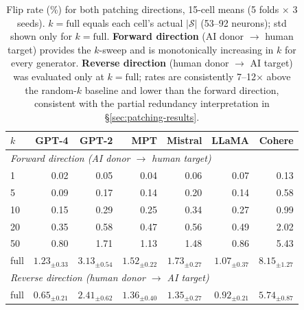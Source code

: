 \documentclass[11pt]{article}
\begin{document}
\begin{table}[!htbp]
\centering
\small
\begin{tabular}{lrrrrrr}
\toprule
$k$ & GPT-4 & GPT-2 & MPT & Mistral & LLaMA & Cohere \\
\midrule
\multicolumn{7}{l}{\textit{Forward direction (AI donor $\to$ human target)}} \\
1    & 0.02 & 0.05 & 0.04 & 0.06 & 0.07 & 0.13 \\
5    & 0.09 & 0.17 & 0.14 & 0.20 & 0.14 & 0.58 \\
10   & 0.15 & 0.29 & 0.25 & 0.34 & 0.27 & 0.99 \\
20   & 0.35 & 0.58 & 0.47 & 0.56 & 0.49 & 2.02 \\
50   & 0.80 & 1.71 & 1.13 & 1.48 & 0.86 & 5.43 \\
full & $1.23_{\pm 0.33}$ & $3.13_{\pm 0.54}$ & $1.52_{\pm 0.22}$ & $1.73_{\pm 0.27}$ & $1.07_{\pm 0.37}$ & $8.15_{\pm 1.27}$ \\
\midrule
\multicolumn{7}{l}{\textit{Reverse direction (human donor $\to$ AI target)}} \\
full & $0.65_{\pm 0.21}$ & $2.41_{\pm 0.62}$ & $1.36_{\pm 0.40}$ & $1.35_{\pm 0.27}$ & $0.92_{\pm 0.21}$ & $5.74_{\pm 0.87}$ \\
\bottomrule
\end{tabular}
\caption{Flip rate (\%) for both patching directions, 15-cell means (5 folds $\times$ 3 seeds). $k = \text{full}$ equals each cell's actual $|\mathcal{S}|$ (53--92 neurons); std shown only for $k = \text{full}$. \textbf{Forward direction} (AI donor $\to$ human target) provides the $k$-sweep and is monotonically increasing in $k$ for every generator. \textbf{Reverse direction} (human donor $\to$ AI target) was evaluated only at $k = \text{full}$; rates are consistently 7--12$\times$ above the random-$k$ baseline and lower than the forward direction, consistent with the partial redundancy interpretation in §\ref{sec:patching-results}.}
\label{tab:patching-sweep}
\end{table}
\end{document}
